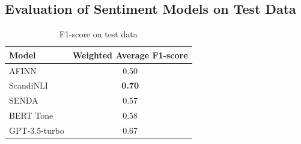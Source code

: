 \documentclass[
]{article}
\begin{document}
\begin{table}[H]
\caption{\label{tab:unnamed-chunk-2}Litterature overview of news value taxonomies (Continued)}
\begin{table}[H]
\centering\begingroup\fontsize{7}{9}\selectfont

\endgroup{}
\end{table}
\end{table}

\hypertarget{evaluation-of-sentiment-models-on-test-data}{%
\subsection{Evaluation of Sentiment Models on Test
Data}\label{evaluation-of-sentiment-models-on-test-data}}

\begin{table}[H]

\caption{\label{tab:unnamed-chunk-3}F1-score on test data}
\centering
\begin{tabular}[t]{lc}
\toprule
Model & Weighted Average F1-score\\
\midrule
AFINN & 0.50\\
ScandiNLI & \textbf{0.70}\\
SENDA & 0.57\\
BERT Tone & 0.58\\
GPT-3.5-turbo & 0.67\\
\bottomrule
\end{tabular}
\end{table}
\end{document}
